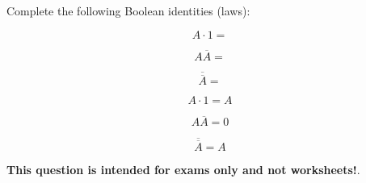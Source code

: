 

Complete the following Boolean identities (laws):

$$A \cdot 1 = $$

$$A\overline{A} = $$

$$\overline{\overline{A}} = $$







$$A \cdot 1 = A$$

$$A\overline{A} = 0$$

$$\overline{\overline{A}} = A$$







{\bf This question is intended for exams only and not worksheets!}.




